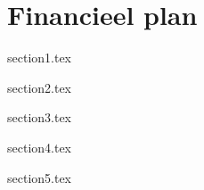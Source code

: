 \chapter{Financieel plan}
\label{Maven}
\thispagestyle{chapternohead}

%
	
\pagestyle{ruledfilip}
{section1.tex}

{section2.tex}


{section3.tex}



{section4.tex}


{section5.tex}


\printbibliography[segment=\therefsegment,heading=subbibliography]

